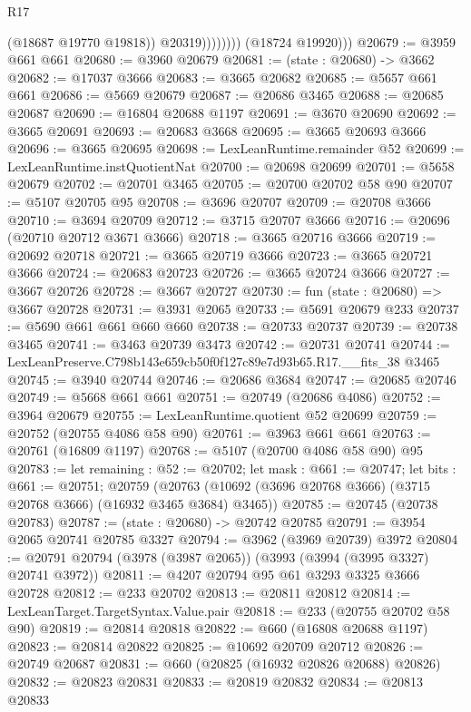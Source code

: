 \begin{lexlean}{R17}
\begin{coremodule}
                          (@18687 @19770 @19818))
                        @20319))))))))
        (@18724 @19920)))
@20679 := @3959 @661 @661
@20680 := @3960 @20679
@20681 := (state : @20680) -> @3662
@20682 := @17037 @3666
@20683 := @3665 @20682
@20685 := @5657 @661 @661
@20686 := @5669 @20679
@20687 := @20686 @3465
@20688 := @20685 @20687
@20690 := @16804 @20688 @1197
@20691 := @3670 @20690
@20692 := @3665 @20691
@20693 := @20683 @3668
@20695 := @3665 @20693 @3666
@20696 := @3665 @20695
@20698 := LexLeanRuntime.remainder @52
@20699 := LexLeanRuntime.instQuotientNat
@20700 := @20698 @20699
@20701 := @5658 @20679
@20702 := @20701 @3465
@20705 := @20700 @20702 @58 @90
@20707 := @5107 @20705 @95
@20708 := @3696 @20707
@20709 := @20708 @3666
@20710 := @3694 @20709
@20712 := @3715 @20707 @3666
@20716 := @20696 (@20710 @20712 @3671 @3666)
@20718 := @3665 @20716 @3666
@20719 := @20692 @20718
@20721 := @3665 @20719 @3666
@20723 := @3665 @20721 @3666
@20724 := @20683 @20723
@20726 := @3665 @20724 @3666
@20727 := @3667 @20726
@20728 := @3667 @20727
@20730 := fun (state : @20680) => @3667 @20728
@20731 := @3931 @2065
@20733 := @5691 @20679 @233
@20737 := @5690 @661 @661 @660 @660
@20738 := @20733 @20737
@20739 := @20738 @3465
@20741 := @3463 @20739 @3473
@20742 := @20731 @20741
@20744 := LexLeanPreserve.C798b143e659cb50f0f127c89e7d93b65.R17.__fits_38 @3465
@20745 := @3940 @20744
@20746 := @20686 @3684
@20747 := @20685 @20746
@20749 := @5668 @661 @661
@20751 := @20749 (@20686 @4086)
@20752 := @3964 @20679
@20755 := LexLeanRuntime.quotient @52 @20699
@20759 := @20752 (@20755 @4086 @58 @90)
@20761 := @3963 @661 @661
@20763 := @20761 (@16809 @1197)
@20768 := @5107 (@20700 @4086 @58 @90) @95
@20783 := let remaining : @52 := @20702;
  let mask : @661 := @20747;
  let bits : @661 := @20751;
  @20759 (@20763 (@10692 (@3696 @20768 @3666) (@3715 @20768 @3666) (@16932 @3465 @3684) @3465))
@20785 := @20745 (@20738 @20783)
@20787 := (state : @20680) -> @20742 @20785
@20791 := @3954 @2065 @20741 @20785 @3327
@20794 := @3962 (@3969 @20739) @3972
@20804 := @20791 @20794 (@3978 (@3987 @2065)) (@3993 (@3994 (@3995 @3327) @20741 @3972))
@20811 := @4207 @20794 @95 @61 @3293 @3325 @3666 @20728
@20812 := @233 @20702
@20813 := @20811 @20812
@20814 := LexLeanTarget.TargetSyntax.Value.pair
@20818 := @233 (@20755 @20702 @58 @90)
@20819 := @20814 @20818
@20822 := @660 (@16808 @20688 @1197)
@20823 := @20814 @20822
@20825 := @10692 @20709 @20712
@20826 := @20749 @20687
@20831 := @660 (@20825 (@16932 @20826 @20688) @20826)
@20832 := @20823 @20831
@20833 := @20819 @20832
@20834 := @20813 @20833

\end{coremodule}
\end{lexlean}
